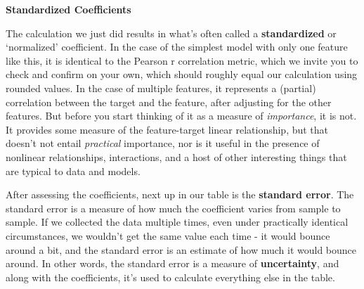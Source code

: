 \documentclass[
  letterpaper,
]{krantz}
\begin{document}
\begin{tcolorbox}[enhanced jigsaw, colframe=quarto-callout-tip-color-frame, opacityback=0, breakable, left=2mm, rightrule=.15mm, toprule=.15mm, arc=.35mm, leftrule=.75mm, colback=white, bottomrule=.15mm]

\vspace{-3mm}\textbf{Standardized Coefficients}\vspace{3mm}

The calculation we just did results in what's often called a
\textbf{standardized} or `normalized' coefficient. In the case of the
simplest model with only one feature like this, it is identical to the
Pearson r correlation metric, which we invite you to check and confirm
on your own, which should roughly equal our calculation using rounded
values. In the case of multiple features, it represents a (partial)
correlation between the target and the feature, after adjusting for the
other features. But before you start thinking of it as a measure of
\emph{importance}, it is not. It provides some measure of the
feature-target linear relationship, but that doesn't not entail
\emph{practical} importance, nor is it useful in the presence of
nonlinear relationships, interactions, and a host of other interesting
things that are typical to data and models.

\end{tcolorbox}

After assessing the coefficients, next up in our table is the
\textbf{standard error}. The standard error is a measure of how much the
coefficient varies from sample to sample. If we collected the data
multiple times, even under practically identical circumstances, we
wouldn't get the same value each time - it would bounce around a bit,
and the standard error is an estimate of how much it would bounce
around. In other words, the standard error is a measure of
\textbf{uncertainty}, and along with the coefficients, it's used to
calculate everything else in the table.
\end{document}
